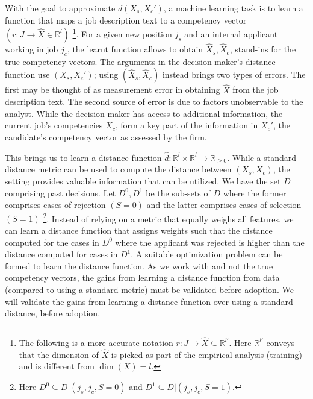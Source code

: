 \documentclass{article}
\begin{document}
With the goal to approximate \(d(X_s, X_c')\), a machine learning task is to learn a function that maps a job description text to a competency vector \((r: J \rightarrow \hat{X} \in \mathbb{R}^l)\) \footnote{The following is a more accurate notation \( r: J \rightarrow \hat{X} \subseteq \mathbb{R}^{l'} \). Here \( \mathbb{R}^{l'} \) conveys that the dimension of \( \hat{X} \) is picked as part of the empirical analysis (training) and is different from \( \dim(X) = l \).}. For a given new position \(j_s\) and an internal applicant working in job \(j_c\), the learnt function allows to obtain \(\hat{X}_s, \hat{X}_c\), stand-ins for the true competency vectors. The arguments in the decision maker's distance function use \((X_s, X_c')\); using \((\hat{X}_s, \hat{X}_c)\) instead brings two types of errors. The first may be thought of as measurement error in obtaining \(\hat{X}\) from the job description text. The second source of error is due to factors unobservable to the analyst. While the decision maker has access to additional information, the current job's competencies \(X_c\), form a key part of the information in \(X_c'\), the candidate's competency vector as assessed by the firm. 

This brings us to learn a distance function \(\hat{d}: \mathbb{R}^l \times \mathbb{R}^l \rightarrow \mathbb{R}_{\geq 0}\). While a standard distance metric can be used to compute the distance between \((X_s, X_c)\), the setting provides valuable information that can be utilized. We have the set \(D\) comprising past decisions. Let \(D^0, D^1\) be the sub-sets of \(D\) where the former comprises cases of rejection \((S = 0)\) and the latter comprises cases of selection \((S = 1)\) \footnote{Here \(D^0 \subseteq D|(j_s, j_c, S = 0)\) and \(D^1 \subseteq D|(j_s, j_c, S = 1)\).}. Instead of relying on a metric that equally weighs all features, we can learn a distance function that assigns weights such that the distance computed for the cases in \(D^0\) where the applicant was rejected is higher than the distance computed for cases in \(D^1\). A suitable optimization problem can be formed to learn the distance function. As we work with  and not the true competency vectors, the gains from learning a distance function from data (compared to using a standard metric) must be validated before adoption. We will validate the gains from learning a distance function over using a standard distance, before adoption. 
\end{document}
